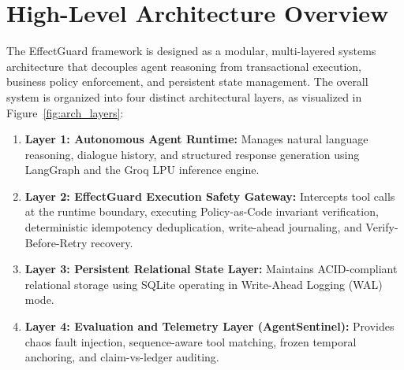 \section{High-Level Architecture Overview}
\label{sec:design_overview}
The EffectGuard framework is designed as a modular, multi-layered systems architecture that decouples agent reasoning from transactional execution, business policy enforcement, and persistent state management. The overall system is organized into four distinct architectural layers, as visualized in Figure~\ref{fig:arch_layers}:
\begin{enumerate}
    \item \textbf{Layer 1: Autonomous Agent Runtime:} Manages natural language reasoning, dialogue history, and structured response generation using LangGraph and the Groq LPU inference engine.
    \item \textbf{Layer 2: EffectGuard Execution Safety Gateway:} Intercepts tool calls at the runtime boundary, executing Policy-as-Code invariant verification, deterministic idempotency deduplication, write-ahead journaling, and Verify-Before-Retry recovery.
    \item \textbf{Layer 3: Persistent Relational State Layer:} Maintains ACID-compliant relational storage using SQLite operating in Write-Ahead Logging (WAL) mode.
    \item \textbf{Layer 4: Evaluation and Telemetry Layer (AgentSentinel):} Provides chaos fault injection, sequence-aware tool matching, frozen temporal anchoring, and claim-vs-ledger auditing.
\end{enumerate}

